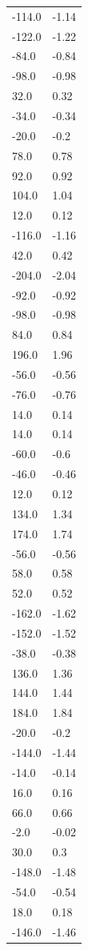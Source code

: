 \begin{longtable}{ll}
-114.0 & -1.14 \\
-122.0 & -1.22 \\
-84.0 & -0.84 \\
-98.0 & -0.98 \\
32.0 & 0.32 \\
-34.0 & -0.34 \\
-20.0 & -0.2 \\
78.0 & 0.78 \\
92.0 & 0.92 \\
104.0 & 1.04 \\
12.0 & 0.12 \\
-116.0 & -1.16 \\
42.0 & 0.42 \\
-204.0 & -2.04 \\
-92.0 & -0.92 \\
-98.0 & -0.98 \\
84.0 & 0.84 \\
196.0 & 1.96 \\
-56.0 & -0.56 \\
-76.0 & -0.76 \\
14.0 & 0.14 \\
14.0 & 0.14 \\
-60.0 & -0.6 \\
-46.0 & -0.46 \\
12.0 & 0.12 \\
134.0 & 1.34 \\
174.0 & 1.74 \\
-56.0 & -0.56 \\
58.0 & 0.58 \\
52.0 & 0.52 \\
-162.0 & -1.62 \\
-152.0 & -1.52 \\
-38.0 & -0.38 \\
136.0 & 1.36 \\
144.0 & 1.44 \\
184.0 & 1.84 \\
-20.0 & -0.2 \\
-144.0 & -1.44 \\
-14.0 & -0.14 \\
16.0 & 0.16 \\
66.0 & 0.66 \\
-2.0 & -0.02 \\
30.0 & 0.3 \\
-148.0 & -1.48 \\
-54.0 & -0.54 \\
18.0 & 0.18 \\
-146.0 & -1.46 \\

\end{longtable}
